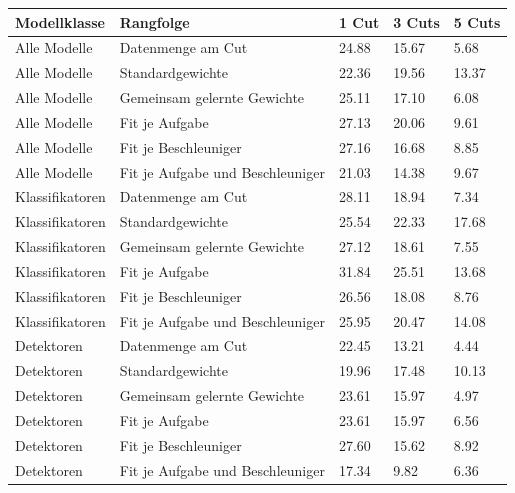 \begin{tabular}{@{}lllll@{}}
\toprule
Modellklasse & Rangfolge & 1 Cut & 3 Cuts & 5 Cuts \\
\midrule
Alle Modelle & Datenmenge am Cut & 24.88 & 15.67 & 5.68 \\
Alle Modelle & Standardgewichte & 22.36 & 19.56 & 13.37 \\
Alle Modelle & Gemeinsam gelernte Gewichte & 25.11 & 17.10 & 6.08 \\
Alle Modelle & Fit je Aufgabe & 27.13 & 20.06 & 9.61 \\
Alle Modelle & Fit je Beschleuniger & 27.16 & 16.68 & 8.85 \\
Alle Modelle & Fit je Aufgabe und Beschleuniger & 21.03 & 14.38 & 9.67 \\
Klassifikatoren & Datenmenge am Cut & 28.11 & 18.94 & 7.34 \\
Klassifikatoren & Standardgewichte & 25.54 & 22.33 & 17.68 \\
Klassifikatoren & Gemeinsam gelernte Gewichte & 27.12 & 18.61 & 7.55 \\
Klassifikatoren & Fit je Aufgabe & 31.84 & 25.51 & 13.68 \\
Klassifikatoren & Fit je Beschleuniger & 26.56 & 18.08 & 8.76 \\
Klassifikatoren & Fit je Aufgabe und Beschleuniger & 25.95 & 20.47 & 14.08 \\
Detektoren & Datenmenge am Cut & 22.45 & 13.21 & 4.44 \\
Detektoren & Standardgewichte & 19.96 & 17.48 & 10.13 \\
Detektoren & Gemeinsam gelernte Gewichte & 23.61 & 15.97 & 4.97 \\
Detektoren & Fit je Aufgabe & 23.61 & 15.97 & 6.56 \\
Detektoren & Fit je Beschleuniger & 27.60 & 15.62 & 8.92 \\
Detektoren & Fit je Aufgabe und Beschleuniger & 17.34 & 9.82 & 6.36 \\
\bottomrule
\end{tabular}
